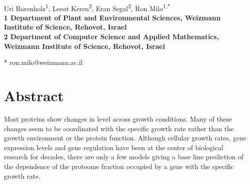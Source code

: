 \documentclass[10pt,letterpaper]{article}
\date{}
\begin{document}
\vspace*{0.35in}

\begin{flushleft}
{\Large
\textbf{}
}
\newline
\\
Uri Barenholz\textsuperscript{1},
Leeat Keren\textsuperscript{2},
Eran Segal\textsuperscript{2},
Ron Milo\textsuperscript{1,*}
\\
\bigskip
\bf{1} Department of Plant and Environmental Sciences, Weizmann Institute of Science, Rehovot, Israel
\\
\bf{2} Department of Computer Science and Applied Mathematics, Weizmann Institute of Science, Rehovot, Israel
\\
\bigskip

* ron.milo@weizmann.ac.il

\end{flushleft}

\linenumbers
\section*{Abstract}
Most proteins show changes in level across growth conditions.
Many of these changes seem to be coordinated with the specific growth rate rather than the growth environment or the protein function.
Although cellular growth rates, gene expression levels and gene regulation have been at the center of biological research for decades, there are only a few models giving a base line prediction of the dependence of the proteome fraction occupied by a gene with the specific growth rate.
\end{document}
